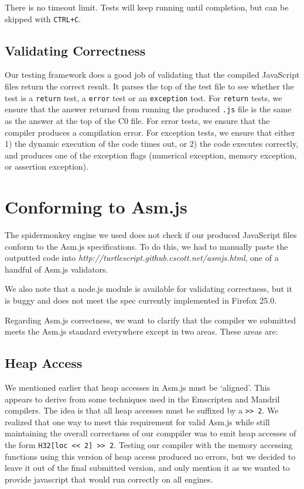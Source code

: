 \documentclass[twoside]{article}
\begin{document}
\begin{multicols}{2}
There is no timeout limit. Tests will keep running until completion, but can be
skipped with \texttt{CTRL+C}.

\subsection{Validating Correctness}

Our testing framework does a good job of validating that the compiled JavaScript
files return the correct result. It parses the top of the test file to see whether
the test is a \texttt{return} test, a \texttt{error} test or an \texttt{exception} 
test. For \texttt{return} tests, we ensure that the answer returned from running 
the produced \texttt{.js} file is the same as the answer at the top of the C0 file.
For error tests, we ensure that the compiler produces a compilation error. For 
exception tests, we ensure that either 1) the dynamic execution of the code times
out, or 2) the code executes correctly, and produces one of the exception flags
(numerical exception, memory exception, or assertion exception). 


\section{Conforming to Asm.js}
The spidermonkey engine we used does not check if our produced JavaScript files
conform to the Asm.js specifications. To do this, we had to manually paste the
outputted code into \emph{http://turtlescript.github.cscott.net/asmjs.html}, one of a 
handful of Asm.js validators. 

We also note that a node.js module is available for validating correctness, 
but it is buggy and does not meet the spec currently implemented in Firefox 25.0.

Regarding Asm.js correctness, we want to clarify that the compiler we submitted
meets the Asm.js standard everywhere except in two areas. These areas are:

  \subsection {Heap Access}
    We mentioned earlier that heap accesses in Asm.js must be `aligned'. This
    appears to derive from some techniques used in the Emscripten and Mandril
    compilers. The idea is that all heap accesses must be suffixed by a \verb+>> 2+.
    We realized that one way to meet this requirement for valid Asm.js while still
    maintaining the overall correctness of our comppiler was to emit heap accesses
    of the form \verb+H32[loc << 2] >> 2+. Testing our compiler with the memory
    accessing functions using this version of heap access produced no errors, but
    we decided to leave it out of the final submitted version, and only mention it
    as we wanted to provide javascript that would run correctly on all engines. 


\end{multicols}
\end{document}
